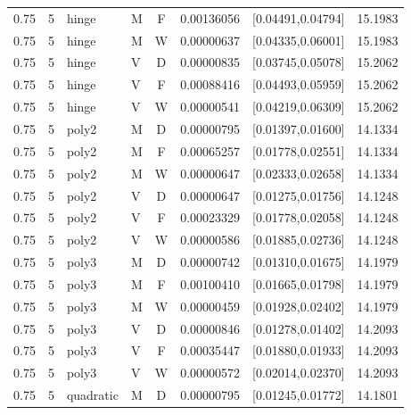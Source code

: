\begin{longtable}{rrllcrrr}
0.75 & 5 & hinge & M & F & 0.00136056 & [0.04491,0.04794] & 15.1983 \\

0.75 & 5 & hinge & M & W & 0.00000637 & [0.04335,0.06001] & 15.1983 \\

0.75 & 5 & hinge & V & D & 0.00000835 & [0.03745,0.05078] & 15.2062 \\

0.75 & 5 & hinge & V & F & 0.00088416 & [0.04493,0.05959] & 15.2062 \\

0.75 & 5 & hinge & V & W & 0.00000541 & [0.04219,0.06309] & 15.2062 \\

0.75 & 5 & poly2 & M & D & 0.00000795 & [0.01397,0.01600] & 14.1334 \\

0.75 & 5 & poly2 & M & F & 0.00065257 & [0.01778,0.02551] & 14.1334 \\

0.75 & 5 & poly2 & M & W & 0.00000647 & [0.02333,0.02658] & 14.1334 \\

0.75 & 5 & poly2 & V & D & 0.00000647 & [0.01275,0.01756] & 14.1248 \\

0.75 & 5 & poly2 & V & F & 0.00023329 & [0.01778,0.02058] & 14.1248 \\

0.75 & 5 & poly2 & V & W & 0.00000586 & [0.01885,0.02736] & 14.1248 \\

0.75 & 5 & poly3 & M & D & 0.00000742 & [0.01310,0.01675] & 14.1979 \\

0.75 & 5 & poly3 & M & F & 0.00100410 & [0.01665,0.01798] & 14.1979 \\

0.75 & 5 & poly3 & M & W & 0.00000459 & [0.01928,0.02402] & 14.1979 \\

0.75 & 5 & poly3 & V & D & 0.00000846 & [0.01278,0.01402] & 14.2093 \\

0.75 & 5 & poly3 & V & F & 0.00035447 & [0.01880,0.01933] & 14.2093 \\

0.75 & 5 & poly3 & V & W & 0.00000572 & [0.02014,0.02370] & 14.2093 \\

0.75 & 5 & quadratic & M & D & 0.00000795 & [0.01245,0.01772] & 14.1801 \\


\end{longtable}
